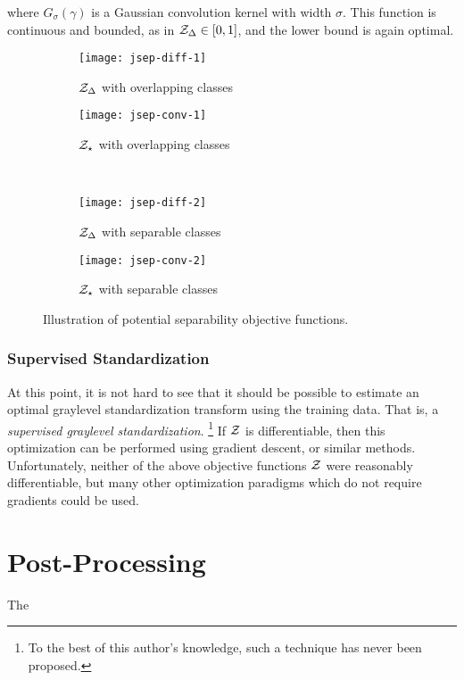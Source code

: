 where $G_{\sigma}(\gamma)$ is a Gaussian convolution kernel with width $\sigma$.
This function is continuous and bounded, as in $\mathcal{Z}_{\Delta}\in\left[0,1\right]$, and the lower bound is again optimal.
\par
\begin{figure}
  \centering
  \begin{subfigure}{\plotwidth}\texttt{[image: jsep-diff-1]}\caption{$\mathcal{Z}_{\Delta}$ with overlapping classes}\label{fig:jsep-diff-1}\end{subfigure}
  \begin{subfigure}{\plotwidth}\texttt{[image: jsep-conv-1]}\caption{$\mathcal{Z}_{\star}$ with overlapping classes}\label{fig:jsep-conv-1}\end{subfigure}\\[1em]
  \begin{subfigure}{\plotwidth}\texttt{[image: jsep-diff-2]}\caption{$\mathcal{Z}_{\Delta}$ with separable classes}\label{fig:jsep-diff-2}\end{subfigure}
  \begin{subfigure}{\plotwidth}\texttt{[image: jsep-conv-2]}\caption{$\mathcal{Z}_{\star}$ with separable classes}\label{fig:jsep-conv-2}\end{subfigure}
  \caption{Illustration of potential separability objective functions.}
  \label{fig:jsep}
\end{figure}
\subsubsection{Supervised Standardization}
At this point, it is not hard to see that it should be possible to estimate an optimal graylevel standardization transform using the training data.
That is, a \textit{supervised graylevel standardization}.%
\footnote{To the best of this author's knowledge, such a technique has never been proposed.}
If $\mathcal{Z}$ is differentiable, then this optimization can be performed using gradient descent, or similar methods.
Unfortunately, neither of the above objective functions $\mathcal{Z}$ were reasonably differentiable, but many other optimization paradigms which do not require gradients could be used.
\section{Post-Processing}\label{s:meth-post}
The 


